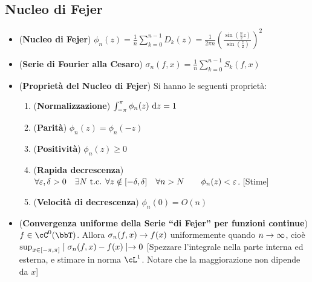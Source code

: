 \documentclass[a4paper,NoNotes,GeneralMath]{stdmdoc}
\newcommand{\intpie}{\int_{-\pi}^\pi }
\newcommand{\CT}[1]{\cC^{#1}(\bbT)}
\begin{document}
        \subsection*{Nucleo di Fejer}
        \begin{itemize}
        \item ({\bf Nucleo di Fejer}) $\phi_n(z) = \frac{1}{n} \sum_{k=0}^{n-1} D_k(z) = \frac{1}{2\pi n} \left( \frac{\sin(\frac{n}{2} z)}{\sin(\frac{z}{2})} \right)^2 $
        \item ({\bf Serie di Fourier alla Cesaro}) $\sigma_n(f, x) = \frac{1}{n} \sum_{k=0}^{n-1} S_k(f, x)$
        \item ({\bf Proprietà del Nucleo di Fejer}) Si hanno le seguenti proprietà:
          \begin{enumerate}
          \item ({\bf Normalizzazione}) $\intpie \phi_n(z) \de z = 1$
          \item ({\bf Parità}) $\phi_n(z) = \phi_n(-z)$
          \item ({\bf Positività}) $\phi_n(z) \ge 0$
          \item ({\bf Rapida decrescenza}) $\forall \varepsilon, \delta > 0 \quad \exists N \mbox{ t.c. } \forall z \notin [-\delta, \delta] \quad \forall n > N \qquad \phi_n(z) < \varepsilon$. [Stime]
          \item ({\bf Velocità di decrescenza}) $\phi_n(0) = O(n)$
          \end{enumerate}
        \item ({\bf Convergenza uniforme della Serie ``di Fejer'' per funzioni continue}) $f \in \CT{0}$. Allora $\sigma_n(f, x) \rightarrow f(x)$ uniformemente quando $n \rightarrow \infty$, cioè $\sup_{x \in [-\pi, \pi]} \mid \sigma_n(f, x) - f(x) \mid \rightarrow 0$ [Spezzare l'integrale nella parte interna ed esterna, e stimare in norma $\cL^1$. Notare che la maggiorazione non dipende da $x$]
        \end{itemize}
\end{document}
